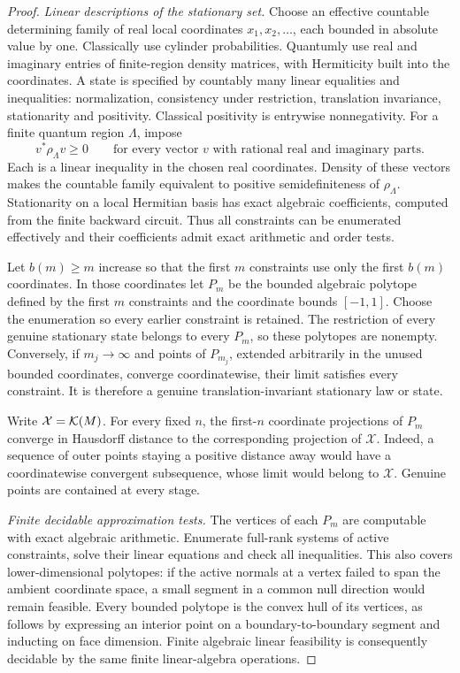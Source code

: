 \begin{proof}
\emph{Linear descriptions of the stationary set.}
Choose an effective countable determining family of real local
coordinates \(x_1,x_2,\ldots\), each bounded in absolute value by
one.  Classically use cylinder probabilities.  Quantumly use real
and imaginary entries of finite-region density matrices, with
Hermiticity built into the coordinates.  A state is specified by
countably many linear equalities and inequalities: normalization,
consistency under restriction, translation invariance, stationarity
and positivity.  Classical positivity is entrywise nonnegativity.
For a finite quantum region \(\Lambda\), impose
\[
 v^*\rho_{\Lambda}v\ge0\qquad
 \text{for every vector }v\text{ with rational real and imaginary parts}.
\]
Each is a linear inequality in the chosen real coordinates.  Density
of these vectors makes the countable family equivalent to positive
semidefiniteness of \(\rho_{\Lambda}\).  Stationarity on a local Hermitian
basis has exact algebraic coefficients, computed from the finite
backward circuit.  Thus all constraints can be enumerated effectively
and their coefficients admit exact arithmetic and order tests.

Let \(b(m)\ge m\) increase so that the first \(m\) constraints use
only the first \(b(m)\) coordinates.  In those coordinates let
\(P_m\) be the bounded algebraic polytope defined by the first
\(m\) constraints and the coordinate bounds \([-1,1]\).
Choose the enumeration so every earlier constraint is retained.
The restriction of every genuine stationary state belongs to every
\(P_m\), so these polytopes are nonempty.  Conversely, if
\(m_j\to\infty\) and points of \(P_{m_j}\), extended arbitrarily
in the unused bounded coordinates, converge coordinatewise, their
limit satisfies every constraint.  It is therefore a genuine
translation-invariant stationary law or state.

Write \(\mathcal X=\mathcal K(M)\).  For every fixed \(n\), the first-\(n\)
coordinate projections of \(P_m\) converge in Hausdorff distance to
the corresponding projection of \(\mathcal X\).  Indeed, a sequence of
outer points staying a positive distance away would have a
coordinatewise convergent subsequence, whose limit would belong to
\(\mathcal X\).  Genuine points are contained at every stage.  

\emph{Finite decidable approximation tests.}
The vertices of each \(P_m\) are computable with exact algebraic
arithmetic.  Enumerate full-rank systems of active constraints,
solve their linear equations and check all inequalities.  This also
covers lower-dimensional polytopes: if the active normals at a
vertex failed to span the ambient coordinate space, a small segment
in a common null direction would remain feasible.  Every bounded
polytope is the convex hull of its vertices, as follows by expressing
an interior point on a boundary-to-boundary segment and inducting on
face dimension.  Finite algebraic linear feasibility is consequently
decidable by the same finite linear-algebra operations.


\end{proof}
